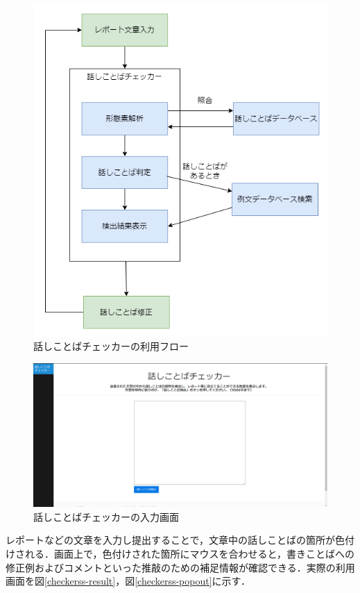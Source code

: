 \begin{figure}[H]
	\centering
 	\includegraphics[width=120mm]{image/checker-flow.png}
	\caption{話しことばチェッカーの利用フロー}
	\label{checkerss-flow}
\end{figure}

\begin{figure}[H] %
	\centering
 	\includegraphics[width=150mm]{image/checkerss-plain.png}
	\caption{話しことばチェッカーの入力画面}
	\label{checkerss-plain}
\end{figure}

レポートなどの文章を入力し提出することで，文章中の話しことばの箇所が色付けされる．画面上で，色付けされた箇所にマウスを合わせると，書きことばへの修正例およびコメントといった推敲のための補足情報が確認できる．実際の利用画面を図\ref{checkerss-result}，図\ref{checkerss-popout}に示す．

